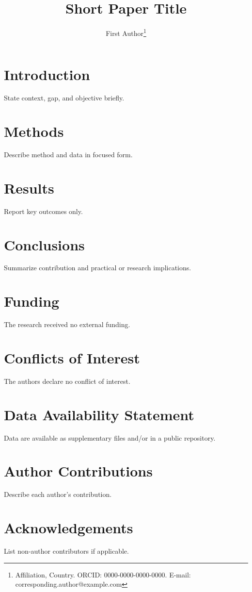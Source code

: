 \documentclass[12pt,a4paper]{article}
\title{Short Paper Title}
\author{First Author\footnote{Affiliation, Country. ORCID: 0000-0000-0000-0000. E-mail: corresponding.author@example.com}}
\date{}
\begin{document}
\maketitle

\begin{sdqabstract}
\end{sdqabstract}


\section{Introduction}
State context, gap, and objective briefly.

\section{Methods}
Describe method and data in focused form.

\section{Results}
Report key outcomes only.

\section{Conclusions}
Summarize contribution and practical or research implications.

\section*{Funding}
The research received no external funding.

\section*{Conflicts of Interest}
The authors declare no conflict of interest.

\section*{Data Availability Statement}
Data are available as supplementary files and/or in a public repository.

\section*{Author Contributions}
Describe each author's contribution.

\section*{Acknowledgements}
List non-author contributors if applicable.

\printbibliography[title={References}]
\end{document}
